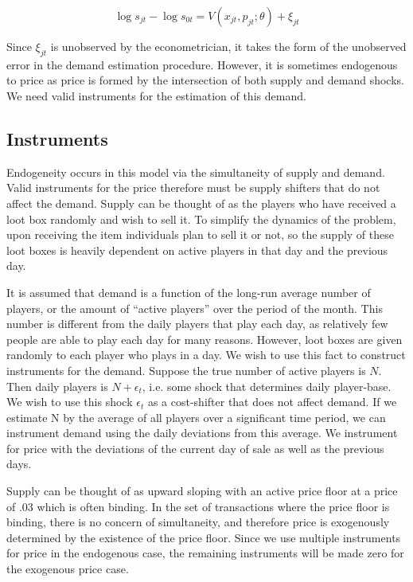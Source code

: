 \documentclass[12pt]{paper}
\begin{document}
\begin{equation*}
  \log s_{jt} - \log s_{0t} = V(x_{jt}, p_{jt}; \theta) + \xi_{jt}
\end{equation*}

Since $\xi_{jt}$ is unobserved by the econometrician, it takes the form
of the unobserved error in the demand estimation procedure. However,
it is sometimes endogenous to price as price is formed by the
intersection of both supply and demand shocks. We need valid
instruments for the estimation of this demand.

\subsection{Instruments}

Endogeneity occurs in this model via the simultaneity of supply and
demand. Valid instruments for the price therefore must be supply
shifters that do not affect the demand. Supply can be thought of as
the players who have received a loot box randomly and wish to sell
it. To simplify the dynamics of the problem, upon receiving the item
individuals plan to sell it or not, so the supply of these loot boxes
is heavily dependent on active players in that day and the previous
day. 

It is assumed that demand is a function of the long-run average number
of players, or the amount of ``active players'' over the period of the
month. This number is different from the daily players that play each
day, as relatively few people are able to play each day for many
reasons. However, loot boxes are given randomly to each player who
plays in a day. We wish to use this fact to construct instruments for
the demand. Suppose the true number of active players is $N$. Then daily
players is $N + \epsilon_t$, i.e. some shock that determines daily
player-base. We wish to use this shock $\epsilon_t$ as a cost-shifter that
does not affect demand. If we estimate N by the average of all players
over a significant time period, we can instrument demand using the
daily deviations from this average. We instrument for price with the
deviations of the current day of sale as well as the previous days.


Supply can be thought of as upward sloping with an active price floor
at a price of $.03$ which is often binding. In the set of transactions
where the price floor is binding, there is no concern of simultaneity,
and therefore price is exogenously determined by the existence of the
price floor. Since we use multiple instruments for price in the
endogenous case, the remaining instruments will be made zero for the
exogenous price case. 
\end{document}
